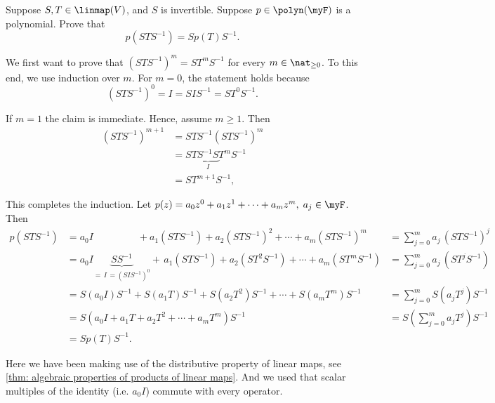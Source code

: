 \begin{xrcs}
  Suppose $S,T \in \linmap (V)$, and $S$ is invertible. Suppose $p \in \polyn(\myF)$ is a polynomial. Prove that
  \begin{equation}
    p(STS^{-1}) = S p(T) S ^{-1}.
  \end{equation}

  \begin{xprf}
    We first want to prove that $(STS^{-1})^m = ST^m S^{-1}$ for every $m \in \nat_{\geq 0}$. To this end, we use induction over $m$. For $m=0$, the statement holds because
    \begin{equation}
      (STS^{-1})^0 = I = SIS^{-1} = ST^0S^{-1}.
    \end{equation}

    If $m=1$ the claim is immediate. Hence, assume $m \geq 1$. Then
    \begin{equation}
      \begin{aligned}
        (STS^{-1})^{m+1} &= STS^{-1} (STS^{-1}) ^m \\
          &= ST\underbrace{S^{-1} S}_{I}T^m S^{-1} \\
          &= S T^{m+1} S^{-1},
      \end{aligned}
    \end{equation}

    This completes the induction. Let $p(z)=a_0 z^0 + a_1 z^1 + \cdots + a_m z^m, \; a_j \in \myF$. Then
    \begin{equation}
      \begin{aligned}
        p(STS^{-1})
          &= a_0 I \phantom{ A A A A A A  } + a_1(STS^{-1}) + a_2 (STS^{-1})^2 + \cdots + a_m (STS^{-1})^m
            & = \textstyle \sum_{j=0}^m a_j\,(STS^{-1})^j \\
          &= a_0 I \underbrace{S S^{-1} }_{= \, I \, = (SIS^{-1})^0} + \, a_1(STS^{-1}) + a_2 (ST^2S^{-1}) + \cdots + a_m (ST^mS^{-1})
            & = \textstyle \sum_{j=0}^m a_j\,(ST^jS^{-1}) \\
          &= S (a_0 I)  S^{-1} + S(a_1T)S^{-1} + S(a_2 T^2)S^{-1} + \cdots + S(a_mT^m)S^{-1}
            & = \textstyle \sum_{j=0}^m S(a_jT^j)S^{-1}\\
          &= S \left( a_0 I  + a_1T + a_2 T^2 + \cdots + a_mT^m \right)S^{-1}
            & = S \left(\textstyle \sum_{j=0}^m a_jT^j\right) S^{-1} \\
          &= S p(T) S^{-1}.
      \end{aligned}
    \end{equation}

    Here we have been making use of the distributive property of linear maps, see  \ref{thm: algebraic properties of products of linear maps}. And we used that scalar multiples of the identity (i.e. $a_0 I$) commute with every operator.
  \end{xprf}
\end{xrcs}

